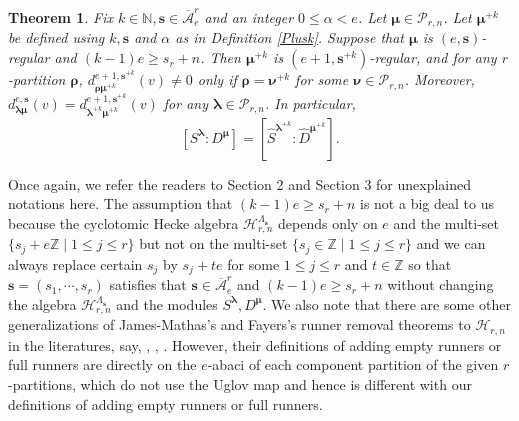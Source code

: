 \documentclass[a4paper,10pt]{amsart}
\theoremstyle{plain}
\renewcommand{\H}{\mathcal{H}}
\def\bs{{\boldsymbol{s}}}
\def\N{{\mathbb N}}
\def\Z{{\mathbb Z}}
\def\Lam{\Lambda}
\def\PP{\mathscr{P}}
\def\blam{{\boldsymbol \lambda}}
\def\bmu{{\boldsymbol \mu}}
\def\brho{{\boldsymbol\rho}}
\def\bnu{{\boldsymbol \nu}}
\theoremstyle{plain}
\newtheorem{mainresult}{Theorem}
\numberwithin{equation}{section}
\begin{document}
\begin{mainresult}\label{mainthm2}
Fix $k\in\N, \bs\in \overline{\mathcal A}^r_e$ and an integer $0 \le \alpha < e$. Let $\bmu\in\PP_{r,n}$. Let $\bmu^{+k}$ be defined using $k, \bs$ and $\alpha$ as in Definition \ref{Plusk}. Suppose that $\bmu$ is $(e,\bs)$-regular and $(k-1)e \ge s_r+n$.  Then $\bmu^{+k}$ is $(e+1,\bs^{+k})$-regular, and for any $r$-partition $\brho$, $d^{e+1,\bs^{+k}}_{\brho\bmu^{+k}}(v)\neq 0$ only if $\brho=\bnu^{+k}$ for some $\bnu\in\PP_{r,n}$. Moreover, $d^{e,\bs}_{\blam \bmu}(v)=d^{e+1,\bs^{+k}}_{\blam^{+k}\bmu^{+k}}(v)$ for any $\blam\in\PP_{r,n}$. In particular, $$
[S^\blam : D^\bmu]=[\hat{S}^{\blam^{+k}} : \hat{D}^{\bmu^{+k}}].
$$
\end{mainresult}
Once again, we refer the readers to Section 2 and Section 3 for unexplained notations here. The assumption that $(k-1)e \ge s_r+n$ is not a big deal to us because the cyclotomic Hecke algebra $\H_{r,n}^{\Lam_\bs}$ depends only on $e$ and the multi-set $\{s_j+e\Z\mid 1\leq j\leq r\}$ but not on the multi-set $\{s_j\in\Z\mid 1\leq j\leq r\}$ and we can always replace certain $s_j$ by $s_j+te$ for some $1\leq j\leq r$ and $t\in\Z$ so that $\bs=(s_1,\cdots,s_r)$ satisfies that $\bs\in \overline{\mathcal A}^r_e$ and $(k-1)e \ge s_r+n$ without changing the algebra $\H_{r,n}^{\Lam_\bs}$ and the modules $S^\blam, D^\bmu$. We also note that there are some other generalizations of James-Mathas's and Fayers's runner removal theorems to $\H_{r,n}$ in the literatures, say, \cite{DellA24b}, \cite{DP2026}, \cite{Q}. However, their definitions of adding empty runners or full runners are directly on the $e$-abaci of each component partition of the given $r$-partitions, which do not use the Uglov map and hence is different with our definitions of adding empty runners or full runners.
\end{document}

